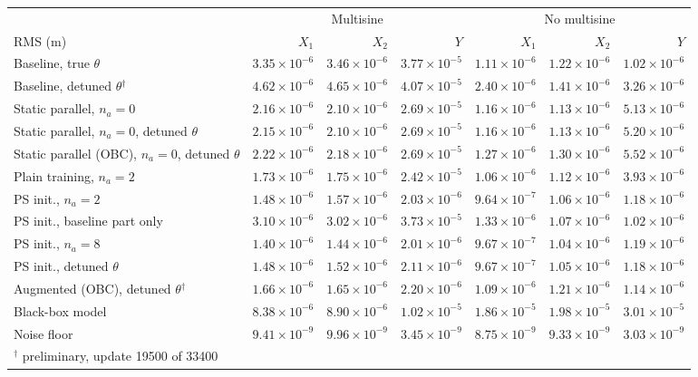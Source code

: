 \setlength{\tabcolsep}{3pt}
\begin{tabular}{l r r r r r r}
\toprule
 & \multicolumn{3}{c}{Multisine} & \multicolumn{3}{c}{No multisine}\\
\cmidrule(lr){2-4}\cmidrule(lr){5-7}
RMS (m) & $X_1$ & $X_2$ & $Y$ & $X_1$ & $X_2$ & $Y$\\
\midrule
Baseline, true $\theta$ & $3.35\times10^{-6}$ & $3.46\times10^{-6}$ & $3.77\times10^{-5}$ & $1.11\times10^{-6}$ & $1.22\times10^{-6}$ & $1.02\times10^{-6}$\\
Baseline, detuned $\theta$$^\dagger$ & $4.62\times10^{-6}$ & $4.65\times10^{-6}$ & $4.07\times10^{-5}$ & $2.40\times10^{-6}$ & $1.41\times10^{-6}$ & $3.26\times10^{-6}$\\
Static parallel, $n_a{=}0$ & $2.16\times10^{-6}$ & $2.10\times10^{-6}$ & $2.69\times10^{-5}$ & $1.16\times10^{-6}$ & $1.13\times10^{-6}$ & $5.13\times10^{-6}$\\
Static parallel, $n_a{=}0$, detuned $\theta$ & $2.15\times10^{-6}$ & $2.10\times10^{-6}$ & $2.69\times10^{-5}$ & $1.16\times10^{-6}$ & $1.13\times10^{-6}$ & $5.20\times10^{-6}$\\
Static parallel (OBC), $n_a{=}0$, detuned $\theta$ & $2.22\times10^{-6}$ & $2.18\times10^{-6}$ & $2.69\times10^{-5}$ & $1.27\times10^{-6}$ & $1.30\times10^{-6}$ & $5.52\times10^{-6}$\\
Plain training, $n_a{=}2$ & $1.73\times10^{-6}$ & $1.75\times10^{-6}$ & $2.42\times10^{-5}$ & $1.06\times10^{-6}$ & $1.12\times10^{-6}$ & $3.93\times10^{-6}$\\
PS init., $n_a{=}2$ & $1.48\times10^{-6}$ & $1.57\times10^{-6}$ & $2.03\times10^{-6}$ & $9.64\times10^{-7}$ & $1.06\times10^{-6}$ & $1.18\times10^{-6}$\\
PS init., baseline part only & $3.10\times10^{-6}$ & $3.02\times10^{-6}$ & $3.73\times10^{-5}$ & $1.33\times10^{-6}$ & $1.07\times10^{-6}$ & $1.02\times10^{-6}$\\
PS init., $n_a{=}8$ & $1.40\times10^{-6}$ & $1.44\times10^{-6}$ & $2.01\times10^{-6}$ & $9.67\times10^{-7}$ & $1.04\times10^{-6}$ & $1.19\times10^{-6}$\\
PS init., detuned $\theta$ & $1.48\times10^{-6}$ & $1.52\times10^{-6}$ & $2.11\times10^{-6}$ & $9.67\times10^{-7}$ & $1.05\times10^{-6}$ & $1.18\times10^{-6}$\\
\midrule
Augmented (OBC), detuned $\theta$$^\dagger$ & $1.66\times10^{-6}$ & $1.65\times10^{-6}$ & $2.20\times10^{-6}$ & $1.09\times10^{-6}$ & $1.21\times10^{-6}$ & $1.14\times10^{-6}$\\
\midrule
Black-box model & $8.38\times10^{-6}$ & $8.90\times10^{-6}$ & $1.02\times10^{-5}$ & $1.86\times10^{-5}$ & $1.98\times10^{-5}$ & $3.01\times10^{-5}$\\
\midrule
Noise floor & $9.41\times10^{-9}$ & $9.96\times10^{-9}$ & $3.45\times10^{-9}$ & $8.75\times10^{-9}$ & $9.33\times10^{-9}$ & $3.03\times10^{-9}$\\
\bottomrule
\multicolumn{7}{l}{\footnotesize $^\dagger$ preliminary, update 19500 of 33400}\\
\end{tabular}
